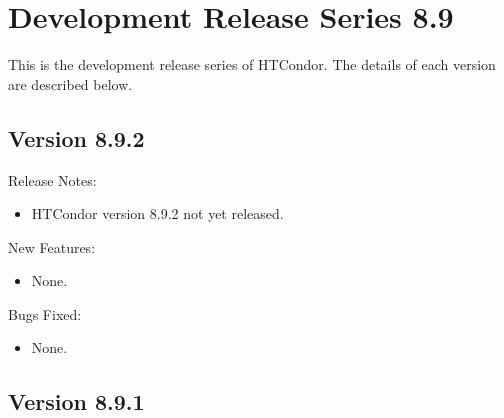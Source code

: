 
\section{Development Release Series 8.9}\label{sec:History-8-9}

This is the development release series of HTCondor.
The details of each version are described below.

\subsection*{\label{sec:New-8-9-2}Version 8.9.2}

\noindent Release Notes:

\begin{itemize}

\item HTCondor version 8.9.2 not yet released.

\end{itemize}


\noindent New Features:

\begin{itemize}

\item None.

\end{itemize}

\noindent Bugs Fixed:

\begin{itemize}

\item None.

\end{itemize}

\subsection*{\label{sec:New-8-9-1}Version 8.9.1}

